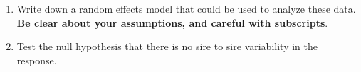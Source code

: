 \documentclass[10pt,twoside]{article}\usepackage[]{graphicx}\usepackage[dvipsnames,svgnames,table]{xcolor}
\begin{document}
\begin{enumerate}
  \begin{enumerate}
    \item Write down a random effects model that could be used to analyze these data. \textbf{Be clear about your assumptions, and careful with subscripts}.
    
    \item Test the null hypothesis that there is no sire to sire variability in the response.
  \end{enumerate}
  

%   
%   
%   



\end{enumerate}
\end{document}
